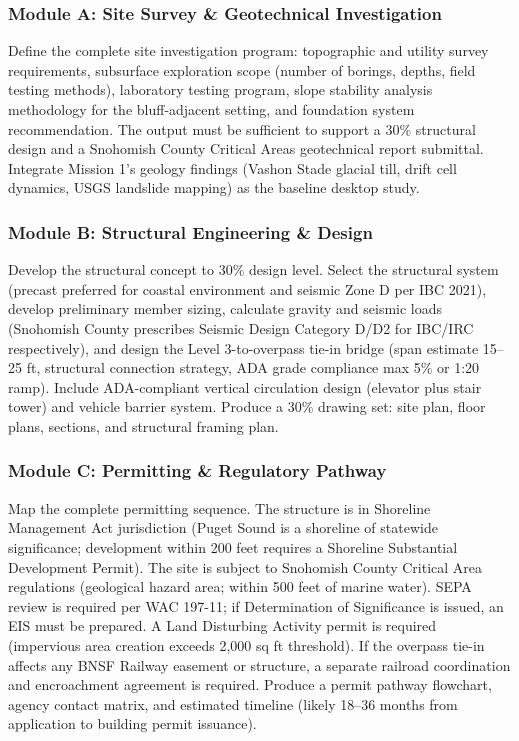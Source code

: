 \documentclass[11pt,letterpaper]{article}
\begin{document}
\subsubsection{Module A: Site Survey \& Geotechnical Investigation}

Define the complete site investigation program: topographic and utility survey requirements, subsurface exploration scope (number of borings, depths, field testing methods), laboratory testing program, slope stability analysis methodology for the bluff-adjacent setting, and foundation system recommendation. The output must be sufficient to support a 30\% structural design and a Snohomish County Critical Areas geotechnical report submittal. Integrate Mission 1's geology findings (Vashon Stade glacial till, drift cell dynamics, USGS landslide mapping) as the baseline desktop study.

\subsubsection{Module B: Structural Engineering \& Design}

Develop the structural concept to 30\% design level. Select the structural system (precast preferred for coastal environment and seismic Zone D per IBC 2021), develop preliminary member sizing, calculate gravity and seismic loads (Snohomish County prescribes Seismic Design Category D/D2 for IBC/IRC respectively), and design the Level 3-to-overpass tie-in bridge (span estimate 15--25 ft, structural connection strategy, ADA grade compliance max 5\% or 1:20 ramp). Include ADA-compliant vertical circulation design (elevator plus stair tower) and vehicle barrier system. Produce a 30\% drawing set: site plan, floor plans, sections, and structural framing plan.

\subsubsection{Module C: Permitting \& Regulatory Pathway}

Map the complete permitting sequence. The structure is in Shoreline Management Act jurisdiction (Puget Sound is a shoreline of statewide significance; development within 200 feet requires a Shoreline Substantial Development Permit). The site is subject to Snohomish County Critical Area regulations (geological hazard area; within 500 feet of marine water). SEPA review is required per WAC 197-11; if Determination of Significance is issued, an EIS must be prepared. A Land Disturbing Activity permit is required (impervious area creation exceeds 2,000 sq ft threshold). If the overpass tie-in affects any BNSF Railway easement or structure, a separate railroad coordination and encroachment agreement is required. Produce a permit pathway flowchart, agency contact matrix, and estimated timeline (likely 18--36 months from application to building permit issuance).
\end{document}
